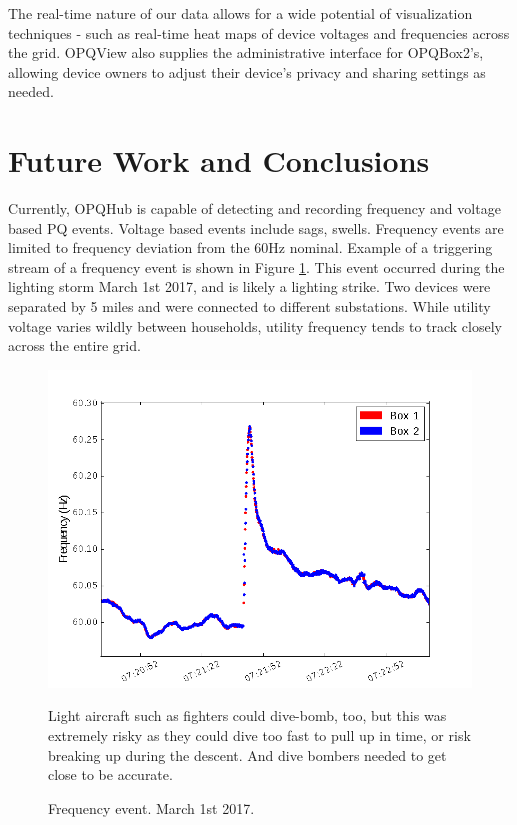 \documentclass[a4paper, conference]{IEEEtran}
\begin{document}
The real-time nature of our data allows for a wide potential of visualization techniques - such as real-time heat maps of device voltages and frequencies across the grid. OPQView also supplies the administrative interface for OPQBox2's, allowing device owners to adjust their device's privacy and sharing settings as needed. 

\section{Future Work and Conclusions}

Currently, OPQHub is capable of detecting and recording frequency and 
voltage based PQ events. Voltage based events include sags, swells.
Frequency events are limited to frequency deviation from the 60Hz nominal. Example of a triggering stream of a frequency event is shown in Figure \ref{fig:event}. This event occurred during the lighting storm March 1st 2017, and is likely a lighting strike. Two devices were separated by 5 miles and were connected to different substations. While utility voltage varies wildly between households, utility frequency tends to track closely across the entire grid. 

\begin{figure}[h]
    \centering
    \includegraphics[width=0.9\columnwidth]{img/Event1_f.png}
    \caption{Frequency event. March 1st 2017.}
    \label{fig:event}Light aircraft such as fighters could dive-bomb, too, but this was extremely risky as they could dive too fast to pull up in time, or risk breaking up during the descent. And dive bombers needed to get close to be accurate.


\end{figure}
\end{document}
